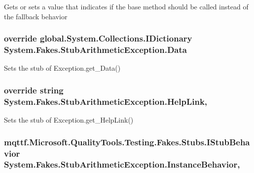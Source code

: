 Gets or sets a value that indicates if the base method should be called instead of the fallback behavior

\hypertarget{class_system_1_1_fakes_1_1_stub_arithmetic_exception_aebd00388ea4746887e02c76c2e7105cc}{
\subsubsection[{Data}]{\setlength{\rightskip}{0pt plus 5cm}override global.\-System.\-Collections.\-I\-Dictionary System.\-Fakes.\-Stub\-Arithmetic\-Exception.\-Data\hspace{0.3cm}{\ttfamily [get]}}}\label{class_system_1_1_fakes_1_1_stub_arithmetic_exception_aebd00388ea4746887e02c76c2e7105cc}


Sets the stub of Exception.\-get\-\_\-\-Data()

\hypertarget{class_system_1_1_fakes_1_1_stub_arithmetic_exception_a12cdede74bdd0f27f0ec5affb2b6fe07}{
\subsubsection[{Help\-Link}]{\setlength{\rightskip}{0pt plus 5cm}override string System.\-Fakes.\-Stub\-Arithmetic\-Exception.\-Help\-Link\hspace{0.3cm}{\ttfamily [get]}, {\ttfamily [set]}}}\label{class_system_1_1_fakes_1_1_stub_arithmetic_exception_a12cdede74bdd0f27f0ec5affb2b6fe07}


Sets the stub of Exception.\-get\-\_\-\-Help\-Link()

\hypertarget{class_system_1_1_fakes_1_1_stub_arithmetic_exception_a193deaaeef7f86afcbefae34a4cba501}{
\subsubsection[{Instance\-Behavior}]{\setlength{\rightskip}{0pt plus 5cm}mqttf.\-Microsoft.\-Quality\-Tools.\-Testing.\-Fakes.\-Stubs.\-I\-Stub\-Behavior System.\-Fakes.\-Stub\-Arithmetic\-Exception.\-Instance\-Behavior\hspace{0.3cm}{\ttfamily [get]}, {\ttfamily [set]}}}\label{class_system_1_1_fakes_1_1_stub_arithmetic_exception_a193deaaeef7f86afcbefae34a4cba501}


